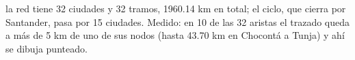 {la red tiene 32 ciudades y 32 tramos, 1960.14 km en total; el ciclo, que cierra por Santander, pasa por 15 ciudades.}
{Medido: en 10 de las 32 aristas el trazado queda a más de 5 km de uno de sus nodos (hasta 43.70 km en Chocontá a Tunja) y ahí se dibuja punteado.}
